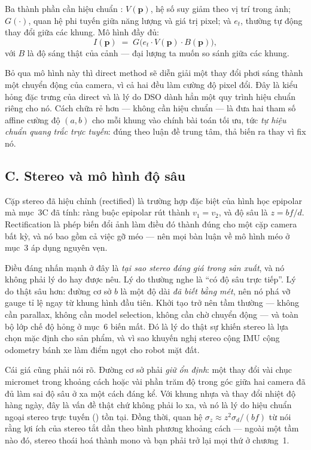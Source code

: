 \documentclass[../../vslam.tex]{subfiles}
\begin{document}
Ba thành phần cần hiệu chuẩn \cite{engel2016photometric}:  \(V(\mathbf{p})\), hệ số suy giảm theo vị trí trong ảnh;  \(G(\cdot)\), quan hệ phi tuyến giữa năng lượng và giá trị pixel; và  \(e_t\), thường tự động thay đổi giữa các khung. Mô hình đầy đủ:
\[
I(\mathbf{p}) \;=\; G\bigl(e_t \cdot V(\mathbf{p}) \cdot B(\mathbf{p})\bigr),
\]
với \(B\) là độ sáng thật của cảnh --- đại lượng ta muốn so sánh giữa các khung.

Bỏ qua mô hình này thì direct method sẽ diễn giải một thay đổi phơi sáng thành một chuyển động của camera, vì cả hai đều làm cường độ pixel đổi. Đây là kiểu hỏng đặc trưng của direct và là lý do DSO dành hẳn một quy trình hiệu chuẩn riêng cho nó. Cách chữa rẻ hơn --- không cần hiệu chuẩn --- là đưa hai tham số affine cường độ \((a, b)\) cho mỗi khung vào chính bài toán tối ưu, tức \emph{tự hiệu chuẩn quang trắc trực tuyến}: đúng theo luận đề trung tâm, thả biến ra thay vì fix nó.

\subsection{C. Stereo và mô hình độ sâu}

Cặp stereo đã hiệu chỉnh (rectified) là trường hợp đặc biệt của hình học epipolar mà  mục~3C đã tính: ràng buộc epipolar rút thành \(v_1 = v_2\), và độ sâu là \(z = b f / d\). Rectification là phép biến đổi ảnh làm điều đó thành đúng cho một cặp camera bất kỳ, và nó bao gồm cả việc gỡ méo --- nên mọi bàn luận về mô hình méo ở mục~3 áp dụng nguyên vẹn.

Điều đáng nhấn mạnh ở đây là \emph{tại sao stereo đáng giá trong sản xuất}, và nó không phải lý do hay được nêu. Lý do thường nghe là ``có độ sâu trực tiếp''. Lý do thật sâu hơn: đường cơ sở \(b\) là một độ dài \emph{đã biết bằng mét}, nên nó phá vỡ gauge tỉ lệ ngay từ khung hình đầu tiên. Khởi tạo trở nên tầm thường --- không cần parallax, không cần model selection, không cần chờ chuyển động --- và toàn bộ lớp chế độ hỏng ở  mục~6 biến mất. Đó là lý do thật sự khiến stereo là lựa chọn mặc định cho sản phẩm, và vì sao  khuyến nghị stereo cộng IMU cộng odometry bánh xe làm điểm ngọt cho robot mặt đất.

Cái giá cũng phải nói rõ. Đường cơ sở phải \emph{giữ ổn định}: một thay đổi vài chục micromet trong khoảng cách hoặc vài phần trăm độ trong góc giữa hai camera đã đủ làm sai độ sâu ở xa một cách đáng kể. Với khung nhựa và thay đổi nhiệt độ hàng ngày, đây là vấn đề thật chứ không phải lo xa, và nó là lý do hiệu chuẩn ngoại stereo trực tuyến () tồn tại. Đồng thời, quan hệ \(\sigma_z \approx z^2\sigma_d/(bf)\) từ  nói rằng lợi ích của stereo tắt dần theo bình phương khoảng cách --- ngoài một tầm nào đó, stereo thoái hoá thành mono và bạn phải trở lại mọi thứ ở chương~1.
\end{document}
